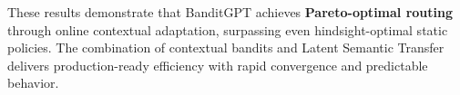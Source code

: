 These results demonstrate that BanditGPT achieves \textbf{Pareto-optimal routing} through online contextual adaptation, surpassing even hindsight-optimal static policies. The combination of contextual bandits and Latent Semantic Transfer delivers production-ready efficiency with rapid convergence and predictable behavior.


